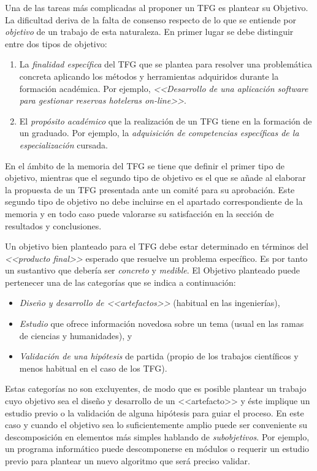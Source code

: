 Una de las tareas más complicadas al proponer un TFG es plantear su \textsf{Objetivo}. La dificultad deriva de la falta de consenso respecto de lo que se entiende por \emph{objetivo} de un trabajo de esta naturaleza. En primer lugar se debe distinguir entre dos tipos de objetivo:

\begin{enumerate}
	\item La \emph{finalidad específica} del TFG que se plantea para resolver una problemática concreta aplicando los métodos y herramientas adquiridos durante la formación académica. Por ejemplo, \emph{<<Desarrollo de una aplicación software para gestionar reservas hoteleras \emph{on-line}>>}.

	\item El \emph{propósito académico} que la realización de un TFG tiene en la formación de un graduado. Por ejemplo, la \emph{adquisición de competencias específicas de la especialización} cursada.
\end{enumerate}

En el ámbito de la memoria del TFG se tiene que definir el primer tipo de objetivo, mientras que el segundo tipo de objetivo es el que se añade al elaborar la propuesta de un TFG presentada ante un comité para su aprobación. Este segundo tipo de objetivo no debe incluirse en el apartado correspondiente de la memoria y en todo caso puede valorarse su satisfacción en la sección de resultados y conclusiones.

Un objetivo bien planteado para el TFG debe estar determinado en términos del \emph{<<producto final>>} esperado que resuelve un problema específico. Es por tanto un sustantivo que debería ser \emph{concreto} y \emph{medible}. El \textsf{Objetivo} planteado puede pertenecer una de las categorías que se indica a continuación:
\begin{itemize}
	\item \emph{Diseño y desarrollo de <<artefactos>>} (habitual en las ingenierías),
	\item \emph{Estudio} que ofrece información novedosa sobre un tema (usual en las ramas de ciencias y humanidades), y
	\item \emph{Validación de una hipótesis} de partida (propio de los trabajos científicos y menos habitual en el caso de los TFG).
\end{itemize}

Estas categorías no son excluyentes, de modo que es posible plantear un trabajo cuyo objetivo sea el diseño y desarrollo de un <<artefacto>> y éste implique un estudio previo o la validación de alguna hipótesis para guiar el proceso. En este caso y cuando el objetivo sea lo suficientemente amplio puede ser conveniente su descomposición en elementos más simples hablando de \emph{subobjetivos}. Por ejemplo, un programa informático puede descomponerse en módulos o requerir un estudio previo para plantear un nuevo algoritmo que será preciso validar.

